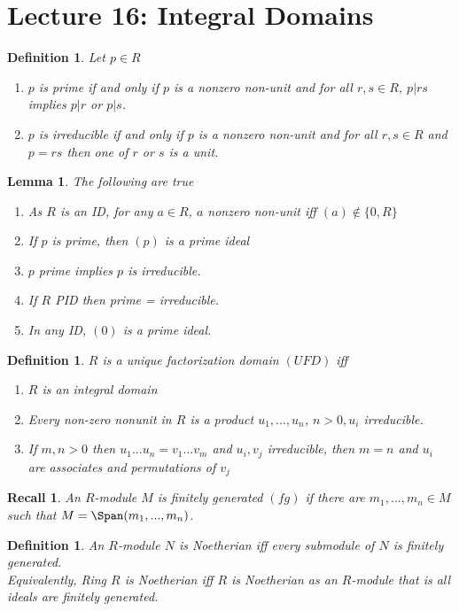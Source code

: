 \documentclass[a4paper,12pt]{article}
\newtheorem{lem}[thm]{Lemma}
\newtheorem{defn}[thm]{Definition}
\newtheorem{rec}[thm]{Recall}
\begin{document}
\section{Lecture 16: Integral Domains}
\begin{defn}
    Let $p\in R$
    \begin{enumerate}
        \item $p$ is prime if and only if $p$ is a nonzero non-unit and for all $r,s\in R$, $p|rs$ implies $p|r$ or $p|s$.
        \item $p$ is irreducible if and only if $p$ is a nonzero non-unit and for all $r,s\in R$ and $p=rs$ then one of $r$ or $s$ is a unit. 
    \end{enumerate}
\end{defn}
\begin{lem}
    The following are true 
    \begin{enumerate}
        \item As $R$ is an ID, for any $a\in R$, $a$ nonzero non-unit iff $(a)\notin \{0,R\}$
        \item If $p$ is prime, then $(p)$ is a prime ideal
        \item $p$ prime implies $p$ is irreducible.
        \item If $R$ PID then prime = irreducible.
        \item In any ID, $(0)$ is a prime ideal. 
    \end{enumerate}
\end{lem}
\begin{defn}
    $R$ is a unique factorization domain $(UFD)$ iff 
    \begin{enumerate}
        \item $R$ is an integral domain
        \item Every non-zero nonunit in $R$ is a product $u_1,...,u_n$, $n>0, u_i$ irreducible. 
        \item If $m,n>0$ then $u_1...u_n=v_1...v_m$ and $u_i,v_j$ irreducible, then $m=n$ and $u_i$ are associates and permutations of $v_j$
    \end{enumerate}
\end{defn}
\begin{rec}
    An $R$-module $M$ is finitely generated $(fg)$ if there are $m_1,...,m_n\in M$ such that $M=\Span(m_1,...,m_n)$.
\end{rec}
\begin{defn}
    An $R$-module $N$ is Noetherian iff every submodule of $N$ is finitely generated.\\
    Equivalently, Ring $R$ is Noetherian iff $R$ is Noetherian as an $R$-module that is all ideals are finitely generated. 
\end{defn}
\end{document}
